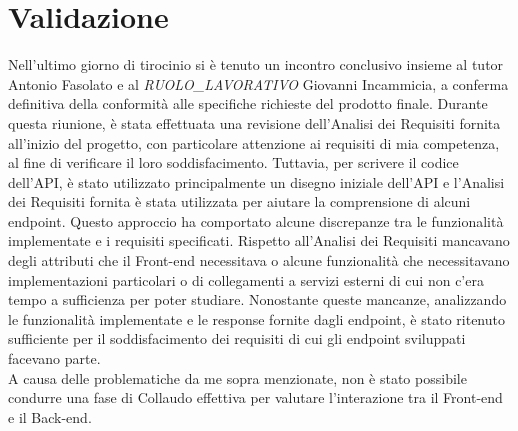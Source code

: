\section{Validazione}
Nell’ultimo giorno di tirocinio si è tenuto un incontro conclusivo insieme al tutor Antonio Fasolato e al \textit{RUOLO\_LAVORATIVO} Giovanni Incammicia, a conferma definitiva della conformità alle specifiche richieste del prodotto finale. Durante questa riunione, è stata effettuata una revisione dell'Analisi dei Requisiti fornita all'inizio del progetto, con particolare attenzione ai requisiti di mia competenza, al fine di verificare il loro soddisfacimento. Tuttavia, per scrivere il codice dell’API, è stato utilizzato principalmente un disegno iniziale dell’API e l’Analisi dei Requisiti fornita è stata utilizzata per aiutare la comprensione di alcuni endpoint. Questo approccio ha comportato alcune discrepanze tra le funzionalità implementate e i requisiti specificati. Rispetto all’Analisi dei Requisiti mancavano degli attributi che il Front-end necessitava o alcune funzionalità che necessitavano implementazioni particolari o di collegamenti a servizi esterni di cui non c’era tempo a sufficienza per poter studiare. Nonostante queste mancanze, analizzando le funzionalità implementate e le response fornite dagli endpoint, è stato ritenuto sufficiente per il soddisfacimento dei requisiti di cui gli endpoint sviluppati facevano parte.\\
A causa delle problematiche da me sopra menzionate, non è stato possibile condurre una fase di Collaudo effettiva per valutare l'interazione tra il Front-end e il Back-end.